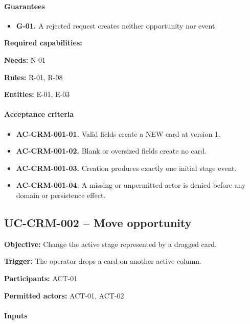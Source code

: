 \documentclass[10pt,a4paper]{article}
\begin{document}
\paragraph{Guarantees}

\begin{itemize}

\item \textbf{G-01.} A rejected request creates neither opportunity nor event.

\end{itemize}

\textbf{Required capabilities:}

\textbf{Needs:} N-01

\textbf{Rules:} R-01, R-08

\textbf{Entities:} E-01, E-03

\paragraph{Acceptance criteria}

\begin{itemize}

\item \textbf{AC-CRM-001-01.} Valid fields create a NEW card at version 1.

\item \textbf{AC-CRM-001-02.} Blank or oversized fields create no card.

\item \textbf{AC-CRM-001-03.} Creation produces exactly one initial stage event.

\item \textbf{AC-CRM-001-04.} A missing or unpermitted actor is denied before any domain or persistence effect.

\end{itemize}

\subsection{UC-CRM-002 -- Move opportunity}

\textbf{Objective:} Change the active stage represented by a dragged card.

\textbf{Trigger:} The operator drops a card on another active column.

\textbf{Participants:} ACT-01

\textbf{Permitted actors:} ACT-01, ACT-02

\paragraph{Inputs}
\end{document}
